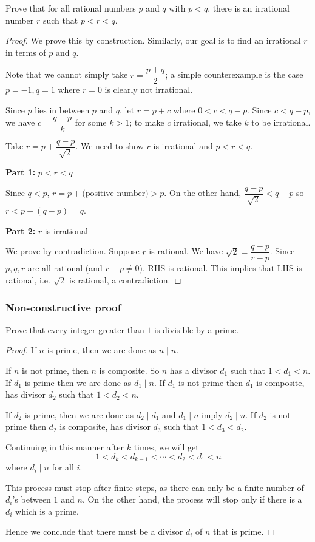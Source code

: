 \begin{exercise}
Prove that for all rational numbers $p$ and $q$ with $p<q$, there is an irrational number $r$ such that $p<r<q$.
\end{exercise}
\begin{proof}
We prove this by construction. Similarly, our goal is to find an irrational $r$ in terms of $p$ and $q$.

Note that we cannot simply take $r=\dfrac{p+q}{2}$; a simple counterexample is the case $p=-1,q=1$ where $r=0$ is clearly not irrational.

Since $p$ lies in between $p$ and $q$, let $r=p+c$ where $0<c<q-p$. Since $c<q-p$, we have $c=\dfrac{q-p}{k}$ for some $k>1$; to make $c$ irrational, we take $k$ to be irrational.

Take $r=p+\dfrac{q-p}{\sqrt{2}}$. We need to show $r$ is irrational and $p<r<q$.

\textbf{Part 1:} $p<r<q$

Since $q<p$, $r=p+\text{(positive number)}>p$. On the other hand, $\dfrac{q-p}{\sqrt{2}}<q-p$ so $r<p+(q-p)=q$.

\textbf{Part 2:} $r$ is irrational

We prove by contradiction. Suppose $r$ is rational. We have $\sqrt{2}=\dfrac{q-p}{r-p}$. Since $p,q,r$ are all rational (and $r-p\neq0$), RHS is rational. This implies that LHS is rational, i.e. $\sqrt{2}$ is rational, a contradiction.
\end{proof}

\subsubsection{Non-constructive proof}


\begin{exercise}{}{}
Prove that every integer greater than $1$ is divisible by a prime.
\end{exercise}

\begin{proof}
If $n$ is prime, then we are done as $n\mid n$.

If $n$ is not prime, then $n$ is composite. So $n$ has a divisor $d_1$ such that $1<d_1<n$. If $d_1$ is prime then we are done as $d_1\mid n$. If $d_1$ is not prime then $d_1$ is composite, has divisor $d_2$ such that $1<d_2<n$.

If $d_2$ is prime, then we are done as $d_2\mid d_1$ and $d_1\mid n$ imply $d_2\mid n$. If $d_2$ is not prime then $d_2$ is composite, has divisor $d_3$ such that $1<d_3<d_2$.

Continuing in this manner after $k$ times, we will get
\[ 1<d_k<d_{k-1}<\cdots<d_2<d_1<n \]
where $d_i\mid n$ for all $i$.

This process must stop after finite steps, as there can only be a finite number of $d_i$'s between $1$ and $n$. On the other hand, the process will stop only if there is a $d_i$ which is a prime. 

Hence we conclude that there must be a divisor $d_i$ of $n$ that is prime.
\end{proof}

